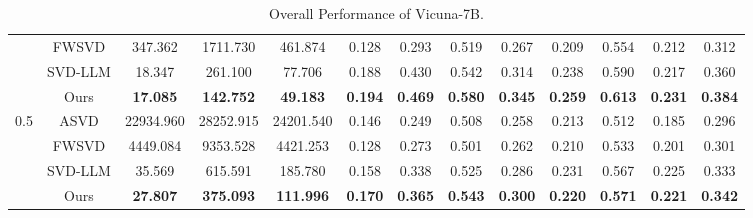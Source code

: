 \documentclass[11pt]{article}
\begin{document}
\begin{table}[ht]
{\begin{tabular}{cc|ccc|cccccccc}
 & FWSVD & 347.362 & 1711.730 & 461.874 & 0.128 & 0.293 & 0.519 & 0.267 & 0.209 & 0.554 & 0.212 & 0.312 \\
 & SVD-LLM & 18.347 & 261.100 & 77.706 & 0.188 & 0.430 & 0.542 & 0.314 & 0.238 & 0.590 & 0.217 & 0.360 \\
 & Ours & \textbf{17.085} & \textbf{142.752} & \textbf{49.183} & \textbf{0.194} & \textbf{0.469} & \textbf{0.580} & \textbf{0.345} & \textbf{0.259} & \textbf{0.613} & \textbf{0.231} & \textbf{0.384} \\ \hline
\multirow{4}{*}{0.5} & ASVD & 22934.960 & 28252.915 & 24201.540 & 0.146 & 0.249 & 0.508 & 0.258 & 0.213 & 0.512 & 0.185 & 0.296 \\
 & FWSVD & 4449.084 & 9353.528 & 4421.253 & 0.128 & 0.273 & 0.501 & 0.262 & 0.210 & 0.533 & 0.201 & 0.301 \\
 & SVD-LLM & 35.569 & 615.591 & 185.780 & 0.158 & 0.338 & 0.525 & 0.286 & 0.231 & 0.567 & 0.225 & 0.333 \\
 & Ours & \textbf{27.807} & \textbf{375.093} & \textbf{111.996} & \textbf{0.170} & \textbf{0.365} & \textbf{0.543} & \textbf{0.300} & \textbf{0.220} & \textbf{0.571} & \textbf{0.221} & \textbf{0.342} \\ \hline \hline
\end{tabular}
}
\caption{Overall Performance of Vicuna-7B.} 
\label{appendix_label2}
\end{table}
\end{document}
